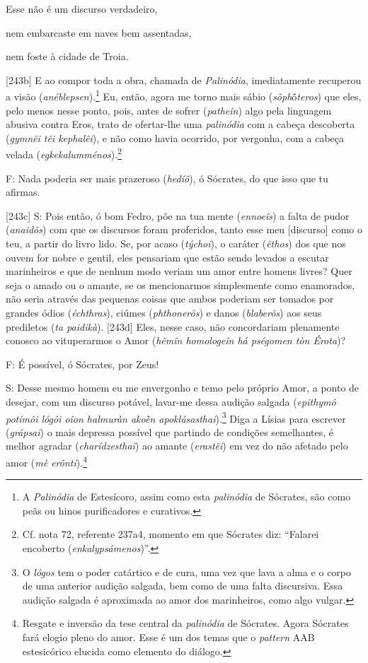 Esse não é um discurso verdadeiro,

nem embarcaste em naves bem assentadas,

nem foste à cidade de Troia.

{[}243b{]} E ao compor toda a obra, chamada de \emph{Palinódia},
imediatamente recuperou a visão (\emph{anéblepsen}).\footnote{A
  \emph{Palinódia} de Estesícoro, assim como esta \emph{palinódia} de
  Sócrates, são como peãs ou hinos purificadores e curativos.} Eu,
então, agora me torno mais sábio (\emph{sôph}ṓ\emph{teros}) que eles,
pelo menos nesse ponto, pois, antes de sofrer (\emph{patheîn}) algo pela
linguagem abusiva contra Eros, trato de ofertar-lhe uma \emph{palinódia}
com a cabeça descoberta (\emph{gymnêi têi kephalêi}), e não como havia
ocorrido, por vergonha, com a cabeça velada
(\emph{egkekalumménos}).\footnote{Cf. nota 72, referente 237a4, momento
  em que Sócrates diz: ``Falarei encoberto (\emph{enkalypsámenos})''.}

F: Nada poderia ser mais prazeroso (\emph{hedíô}), ó Sócrates, do que
isso que tu afirmas.

{[}243c{]} S: Pois então, ó bom Fedro, põe na tua mente (\emph{ennoeîs})
a falta de pudor (\emph{anaidôs}) com que os discursos foram proferidos,
tanto esse meu {[}discurso{]} como o teu, a partir do livro lido. Se,
por acaso (\emph{týchoi}), o caráter (\emph{êthos}) dos que nos ouvem
for nobre e gentil, eles pensariam que estão sendo levados a escutar
marinheiros e que de nenhum modo veriam um amor entre homens livres?
Quer seja o amado ou o amante, se os mencionarmos simplesmente como
enamorados, não seria através das pequenas coisas que ambos poderiam ser
tomados por grandes ódios (\emph{échthras}), ciúmes (\emph{phthonerôs})
e danos (\emph{blaberôs}) aos seus prediletos (\emph{ta paidikà}).
{[}243d{]} Eles, nesse caso, não concordariam plenamente conosco ao
vituperarmos o Amor (\emph{hêmîn homologeîn há pségomen tòn Érota})?

F: É possível, ó Sócrates, por Zeus!

S: Desse mesmo homem eu me envergonho e temo pelo próprio Amor, a ponto
de desejar, com um discurso potável, lavar-me dessa audição salgada
(\emph{epithymô potímôi lógôi oîon halmuràn akoḕn
apoklúsasthai}).\footnote{O \emph{lógos} tem o poder catártico e de
  cura, uma vez que lava a alma e o corpo de uma anterior audição
  salgada, bem como de uma falta discursiva. Essa audição salgada é
  aproximada ao amor dos marinheiros, como algo vulgar.} Diga a Lísias
para escrever (\emph{grápsai}) o mais depressa possível que partindo de
condições semelhantes, é melhor agradar (\emph{charídzesthai}) ao amante
(\emph{erastêi}) em vez do não afetado pelo amor (\emph{mè
erônti}).\footnote{Resgate e inversão da tese central da
  \emph{palinódia} de Sócrates. Agora Sócrates fará elogio pleno do
  amor. Esse é um dos temas que o \emph{pattern} AAB estesicórico
  elucida como elemento do diálogo.}

